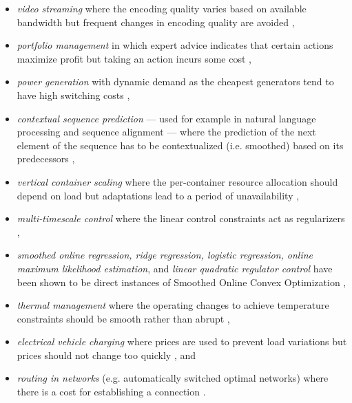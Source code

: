 \begin{itemize}
    \item \textit{video streaming} where the encoding quality varies based on available bandwidth but frequent changes in encoding quality are avoided \cite{Lin2012},
    \item \textit{portfolio management} in which expert advice indicates that certain actions maximize profit but taking an action incurs some cost \cite{Calafiore2008, Das2014, Ballu2019},
    \item \textit{power generation} with dynamic demand as the cheapest generators tend to have high switching costs \cite{Lin2012, Badiei2015},
    \item \textit{contextual sequence prediction} --- used for example in natural language processing and sequence alignment --- where the prediction of the next element of the sequence has to be contextualized (i.e. smoothed) based on its predecessors \cite{Kim2015},
    \item \textit{vertical container scaling} where the per-container resource allocation should depend on load but adaptations lead to a period of unavailability \cite{Rossi2019},
    \item \textit{multi-timescale control} where the linear control constraints act as regularizers \cite{Goel2017},
    \item \textit{smoothed online regression, ridge regression, logistic regression, online maximum likelihood estimation}, and \textit{linear quadratic regulator control} have been shown to be direct instances of Smoothed Online Convex Optimization \cite{Goel2018},
    \item \textit{thermal management} where the operating changes to achieve temperature constraints should be smooth rather than abrupt \cite{Zanini2009},
    \item \textit{electrical vehicle charging} where prices are used to prevent load variations but prices should not change too quickly \cite{Kim2014}, and
    \item \textit{routing in networks} (e.g. automatically switched optimal networks) where there is a cost for establishing a connection \cite{Lin2012}.
\end{itemize}
